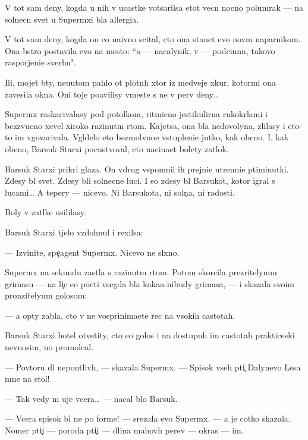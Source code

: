 \documentclass[12pt]{book}
\begin{document}
V tot sam{\yi}{\y} deny, kogda u nih v ucastke votsarilsa etot vecn{\yi}{\y} nocno{\y} polumrak — na solnecn{\yi}{\y} svet u Superm{\yi}xi b{\yi}la allergi{\y}a.

V tot sam{\yi}{\y} deny, kogda on {\y}e{\x}o naivno scital, cto ona stanet {\y}evo nov{\yi}m naparnikom. Ona b{\yi}stro postavila {\y}evo na mesto: ``{\Y}a — nacalynik, v{\yi} — podcin{\e}nn{\yi}{\y}, takovo raspor{\ia}jeni{\y}e sverhu".

Ili, mojet b{\yi}ty, neu{\y}utom pahlo ot plotn{\yi}h xtor iz medvej{\y}e{\y} xkur{\yi}, ko\-to\-r{\yi}\-mi ona zavesila okna. Oni toje po{\y}avilisy vmeste s ne{\y} v perv{\yi}{\y} deny…

Superm{\yi}x raskacivalasy pod potolkom, ritmicno jestikuliru{\y}a ru\-ko\-kr{\yi}\-l{\y}a\-mi i bezzvucno xevel{\ia} xiroko razinut{\yi}m rtom. Kajetsa, ona b{\yi}la nedovolyna, zlilasy i cto-to im v{\yi}govarivala. V{\yi}gl{\ia}delo eto bezmolvno{\y}e v{\yi}stupleni{\y}e jutko, kak ob{\yi}cno. I, kak ob{\yi}cno, Barsuk Starxi{\y} pocustvoval, cto nacina{\y}et bolety zat{\yi}lok.

Barsuk Starxi{\y} prikr{\yi}l glaza. On vdrug vspomnil ih prejni{\y}e utrenni{\y}e p{\ia}\-ti\-mi\-nut\-ki. Zdesy b{\yi}l svet. Zdesy b{\yi}li solnecn{\yi}{\y}e luci. I {\y}e{\x}o zdesy b{\yi}l Barsukot, kotor{\yi}{\y} igral s lucami… A tepery — nicevo. Ni Barsukota, ni soln{\c}a, ni radosti.

Boly v za\-t{\yi}l\-ke usililasy.

Barsuk Starxi{\y} t{\ia}jelo vzdohnul i rexilsa:

— Izvinite, spe{\c}agent Superm{\yi}x. Nicevo ne sl{\yi}xno.

Superm{\yi}x na sekundu zast{\yi}la s razinut{\yi}m rtom. Potom skorcila pre\-zri\-tely\-nu\-{\y}u grimasu — na li{\c}e {\y}e{\y}o pocti vsegda b{\yi}la kaka{\y}a-nibudy grimasa, — i skazala svo{\y}im pronzitelyn{\yi}m golosom:

— {\Y}a op{\ia}ty zab{\yi}la, cto v{\yi} ne vosprinima{\y}ete rec na v{\yi}sokih castotah.

Barsuk Starxi{\y} hotel otvetity, cto {\y}e{\y}o golos i na dostupn{\yi}h im castotah prakticeski nev{\yi}nosim, no promolcal.

— Povtor{\ia}{\y}u dl{\ia} nepon{\ia}tliv{\yi}h, — skazala Superm{\yi}x. — Spisok vseh pti{\c} Dalynevo Lesa mne na stol!

— Tak vedy m{\yi} uje vcera… — nacal b{\yi}lo Barsuk.

— Vcera spisok b{\yi}l ne po forme! — srezala {\y}evo Superm{\yi}x. — {\Y}a je cotko skazala. Nomer pti{\c}i — poroda pti{\c}i — dlina mahov{\yi}h per{\y}ev — okras — im{\ia}.
\end{document}
